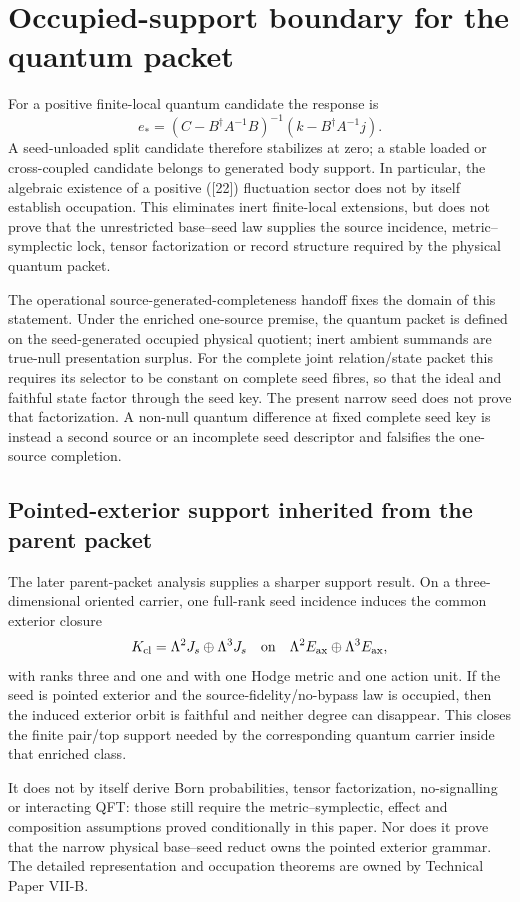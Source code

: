 \documentclass[11pt]{article}
\begin{document}
\section{Occupied-support boundary for the quantum packet}

For a positive finite-local quantum candidate the response is
\[
 e_*=(C-B^\dagger A^{-1}B)^{-1}
      (k-B^\dagger A^{-1}j).
\]
A seed-unloaded split candidate therefore stabilizes at zero; a stable loaded
or cross-coupled candidate belongs to generated body support. In particular,
the algebraic existence of a positive ([22]) fluctuation sector does not by
itself establish occupation. This eliminates inert finite-local extensions,
but does not prove that the unrestricted base--seed law supplies the source
incidence, metric--symplectic lock, tensor factorization or record structure
required by the physical quantum packet.

The operational source-generated-completeness handoff fixes the domain of
this statement. Under the enriched one-source premise, the quantum packet is
defined on the seed-generated occupied physical quotient; inert ambient
summands are true-null presentation surplus. For the complete joint
relation/state packet this requires its selector to be constant on complete
seed fibres, so that the ideal and faithful state factor through the seed
key. The present narrow seed does not prove that factorization. A non-null
quantum difference at fixed complete seed key is instead a second source or
an incomplete seed descriptor and falsifies the one-source completion.

\subsection*{Pointed-exterior support inherited from the parent packet}

The later parent-packet analysis supplies a sharper support result.  On a
three-dimensional oriented carrier, one full-rank seed incidence induces the
common exterior closure
\[
 K_{\rm cl}=\Lambda^2J_s\oplus\Lambda^3J_s
 \quad\hbox{on}\quad
 \Lambda^2E_{\rm ax}\oplus\Lambda^3E_{\rm ax},
\]
with ranks three and one and with one Hodge metric and one action unit.  If the
seed is pointed exterior and the source-fidelity/no-bypass law is occupied,
then the induced exterior orbit is faithful and neither degree can disappear.
This closes the finite pair/top support needed by the corresponding quantum
carrier inside that enriched class.

It does not by itself derive Born probabilities, tensor factorization,
no-signalling or interacting QFT: those still require the metric--symplectic,
effect and composition assumptions proved conditionally in this paper.  Nor
does it prove that the narrow physical base--seed reduct owns the pointed
exterior grammar.  The detailed representation and occupation theorems are
owned by Technical Paper VII-B.
\end{document}
